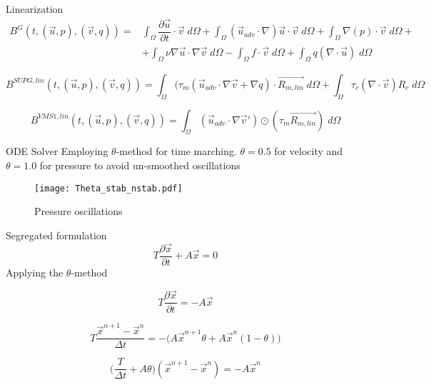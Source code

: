 \begin{frame}{Linearization}
\begin{equation}
  \begin{split}
  B^G(t, (\Vec{u},p), (\Vec{v},q))  = &  \int_\Omega \dfrac{\partial \Vec{u}}{\partial t}\cdot \Vec{v}\;d\Omega +
      \int_\Omega(\Vec{u}_{adv}\cdot\nabla)\Vec{u}\cdot \Vec{v} \;d\Omega+ 
      \int_\Omega \nabla (p)\cdot\Vec{v} \;d\Omega + \\
      & + \int_\Omega\nu\nabla\Vec{u}\cdot\nabla\Vec{v} \;d\Omega  -
          \int_\Omega f\cdot\Vec{v} \;d\Omega + 
      \int_\Omega q(\nabla \cdot \Vec{u})\;d\Omega
  \end{split}
      \label{equ:Bglin}
  \end{equation}
  
  \begin{equation}
  B^{SUPG,lin}(t, (\Vec{u},p), (\Vec{v},q))  =     \int_\Omega(\tau_m(\Vec{u}_{adv}\cdot\nabla \Vec{v} +\nabla q)\cdot\Vec{R_{m,lin}} \;d\Omega+ \int_\Omega \tau_c (\nabla \cdot \Vec{v})R_c \;d\Omega
  \label{equ:bsupglin}
  \end{equation}
  
  \begin{equation}
  B^{VMS1,lin}(t, (\Vec{u},p), (\Vec{v},q))  = \int_\Omega (\Vec{u}_{adv}\cdot\nabla \Vec{v}')\odot(\tau_m \Vec{R_{m,lin}}) \;d\Omega
  \label{equ:bvms1lin}
  \end{equation}
\end{frame}


\begin{frame}{ODE Solver}
Employing $\theta$-method for time marching. $\theta=0.5$ for velocity and $\theta=1.0$ for pressure to avoid un-smoothed oscillations
\begin{figure}
  \centering
  \texttt{[image: Theta\_stab\_nstab.pdf]}
  \caption{Pressure oscillations}
\end{figure} 
\end{frame}


\begin{frame}{Segregated formulation}
\begin{equation}
  T\dfrac{\partial \Vec{x}}{\partial t} + A \Vec{x} = 0
  \label{equseg:eq1}
\end{equation}
Applying the $\theta$-method

\begin{equation}
      T\dfrac{\partial \Vec{x}}{\partial t} = - A \Vec{x}
      \label{equseg:eq2}
\end{equation}


\begin{equation}
      T\dfrac{\Vec{x}^{n+1}-\Vec{x}^{n}}{\Delta t} = - \bigg ( A \Vec{x}^{n+1}\theta + A\Vec{x}^n(1-\theta) \bigg )
      \label{equseg:eq3}
\end{equation}

\begin{equation}
      \bigg (\dfrac{T}{\Delta t}+A\theta \bigg )(\Vec{x}^{n+1}-\Vec{x}^{n}) = - A \Vec{x}^{n}
\end{equation}
  
\end{frame}

